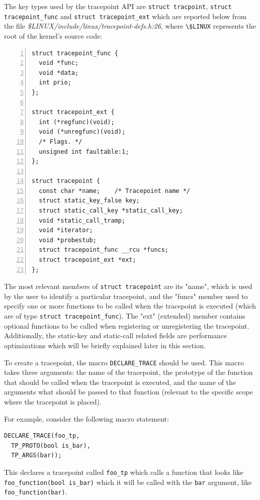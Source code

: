 The key types used by the tracepoint API are \verb|struct tracpoint|,
\verb|struct tracepoint_func| and \verb|struct tracepoint_ext| which are
reported below from the file
\textit{\$LINUX/include/linux/tracepoint-defs.h:26}, where \verb|\$LINUX|
represents the root of the kernel's source code:

\begin{Verbatim}[numbers=left, numbersep=5pt, frame=single]
struct tracepoint_func {
  void *func;
  void *data;
  int prio;
};

struct tracepoint_ext {
  int (*regfunc)(void);
  void (*unregfunc)(void);
  /* Flags. */
  unsigned int faultable:1;
};

struct tracepoint {
  const char *name;    /* Tracepoint name */
  struct static_key_false key;
  struct static_call_key *static_call_key;
  void *static_call_tramp;
  void *iterator;
  void *probestub;
  struct tracepoint_func __rcu *funcs;
  struct tracepoint_ext *ext;
};
\end{Verbatim}

The most relevant members of \verb|struct tracepoint| are its "name", which is
used by the user to identify a particular tracepoint, and the "funcs" member
used to specify one or more functions to be called when the tracepoint is
executed (which are of type \verb|struct tracepoint_func|). The "ext" (extended)
member contains optional functions to be called when registering or
unregistering the tracepoint. Additionally, the static-key and static-call
related fields are performance optimizations which will be briefly explained
later in this section.

To create a tracepoint, the macro \verb|DECLARE_TRACE| should be used. This
macro takes three arguments: the name of the tracepoint, the prototype of the
function that should be called when the tracepoint is executed, and the name of
the arguments what should be passed to that function (relevant to the specific
scope where the tracepoint is placed).

For example, consider the following macro statement:

\begin{verbatim}
DECLARE_TRACE(foo_tp,
  TP_PROTO(bool is_bar),
  TP_ARGS(bar));
\end{verbatim}

This declares a tracepoint called \verb|foo_tp| which calls a function that
looks like \verb|foo_function(bool is_bar)| which it will be called with the
\verb|bar| argument, like \verb|foo_function(bar)|.

